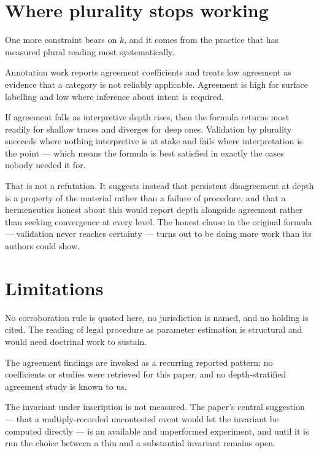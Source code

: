 \documentclass[11pt,a4paper]{article}
\begin{document}
\section{Where plurality stops working}
One more constraint bears on $k$, and it comes from the practice that has measured plural reading most systematically.

Annotation work reports agreement coefficients and treats low agreement as evidence that a category is not reliably applicable. Agreement is high for surface labelling and low where inference about intent is required.

If agreement falls as interpretive depth rises, then the formula returns most readily for shallow traces and diverges for deep ones. Validation by plurality succeeds where nothing interpretive is at stake and fails where interpretation is the point --- which means the formula is best satisfied in exactly the cases nobody needed it for.

That is not a refutation. It suggests instead that persistent disagreement at depth is a property of the material rather than a failure of procedure, and that a hermeneutics honest about this would report depth alongside agreement rather than seeking convergence at every level. The honest clause in the original formula --- validation never reaches certainty --- turns out to be doing more work than its authors could show.

\section{Limitations}
No corroboration rule is quoted here, no jurisdiction is named, and no holding is cited. The reading of legal procedure as parameter estimation is structural and would need doctrinal work to sustain.

The agreement findings are invoked as a recurring reported pattern; no coefficients or studies were retrieved for this paper, and no depth-stratified agreement study is known to us.

The invariant under inscription is not measured. The paper's central suggestion --- that a multiply-recorded uncontested event would let the invariant be computed directly --- is an available and unperformed experiment, and until it is run the choice between a thin and a substantial invariant remains open.
\end{document}
